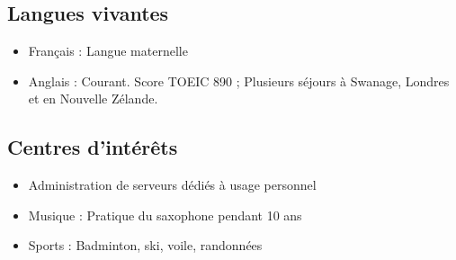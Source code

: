 \documentclass[11pt,a4paper,sans]{article} %
\begin{document}

\subsection{Langues vivantes}

\begin{itemize}
  \item Français : Langue maternelle
  \item Anglais : Courant. Score TOEIC 890 ; Plusieurs séjours à Swanage, Londres et en Nouvelle Zélande.
\end{itemize}


\subsection{Centres d'intérêts}

\begin{itemize}
  \item Administration de serveurs dédiés à usage personnel
  \item Musique : Pratique du saxophone pendant 10 ans
  \item Sports : Badminton, ski, voile, randonnées
\end{itemize}
\end{document}
